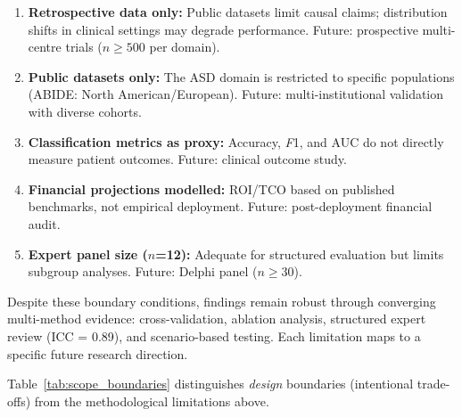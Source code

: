 \begin{enumerate}[nosep]
    \item \textbf{Retrospective data only:} Public datasets limit causal claims; distribution shifts in clinical settings may degrade performance. Future: prospective multi-centre trials ($n \geq 500$ per domain).
    \item \textbf{Public datasets only:} The ASD domain is restricted to specific populations (ABIDE: North American/European). Future: multi-institutional validation with diverse cohorts.
    \item \textbf{Classification metrics as proxy:} Accuracy, \textit{F}1, and AUC do not directly measure patient outcomes. Future: clinical outcome study.
    \item \textbf{Financial projections modelled:} ROI/TCO based on published benchmarks, not empirical deployment. Future: post-deployment financial audit.
    \item \textbf{Expert panel size ($n$=12):} Adequate for structured evaluation but limits subgroup analyses. Future: Delphi panel ($n \geq 30$).
\end{enumerate}

\noindent Despite these boundary conditions, findings remain robust through converging multi-method evidence: cross-validation, ablation analysis, structured expert review (ICC = 0.89), and scenario-based testing. Each limitation maps to a specific future research direction.


Table~\ref{tab:scope_boundaries} distinguishes \textit{design} boundaries (intentional trade-offs) from the methodological limitations above.

